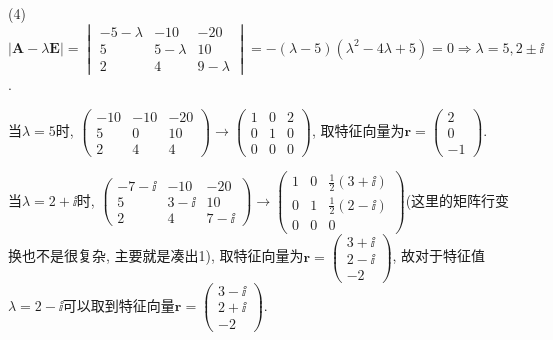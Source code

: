 \begin{solve}
(4)$\displaystyle|\bm{A}-\lambda\bm{E}|=\begin{vmatrix}-5-\lambda&-10&-20\\5&5-\lambda&10\\2&4&9-\lambda\end{vmatrix}=-(\lambda-5)(\lambda^2-4\lambda+5)=0\Rightarrow\lambda=5,2\pm\ii$.

当$\lambda=5$时, 
$\begin{pmatrix}-10&-10&-20\\5&0&10\\2&4&4\end{pmatrix}\to\begin{pmatrix}1&0&2\\0&1&0\\0&0&0\end{pmatrix}$, 
取特征向量为$\bm{r}=\begin{pmatrix}2\\0\\-1\end{pmatrix}$.

当$\lambda=2+\ii$时, 
$\begin{pmatrix}-7-\ii&-10&-20\\5&3-\ii&10\\2&4&7-\ii\end{pmatrix}\to\begin{pmatrix}1&0&\frac{1}{2}(3+\ii)\\0&1&\frac{1}{2}(2-\ii)\\0&0&0\end{pmatrix}$(这里的矩阵行变换也不是很复杂, 主要就是凑出1), 
取特征向量为$\bm{r}=\begin{pmatrix}3+\ii\\2-\ii\\-2\end{pmatrix}$, 故对于特征值$\lambda=2-\ii$可以取到特征向量$\bm{r}=\begin{pmatrix}3-\ii\\2+\ii\\-2\end{pmatrix}$.


\end{solve}
